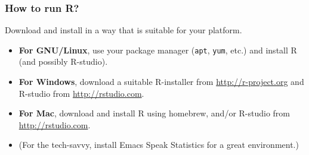 \documentclass[]{beamer}
\begin{document}
\begin{frame}
  \frametitle{How to run R?}
  Download and install in a way that is suitable for your platform.

  \begin{itemize}
  \item \textbf{For GNU/Linux}, use your package manager
    (\texttt{apt}, \texttt{yum}, etc.) and install R (and possibly
    R-studio).

  \item \textbf{For Windows}, download a suitable R-installer from
    \url{http://r-project.org} and R-studio from
    \url{http://rstudio.com}.

  \item \textbf{For Mac}, download and install R using homebrew, and/or
    R-studio from \url{http://rstudio.com}.

    
  \item (For the tech-savvy, install Emacs Speak Statistics for a
    great environment.)

  \end{itemize}
\end{frame}

          
\end{document}
